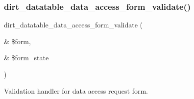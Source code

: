\subsubsection{\texorpdfstring{dirt\+\_\+datatable\+\_\+data\+\_\+access\+\_\+form\+\_\+validate()}{dirt\_datatable\_data\_access\_form\_validate()}}
{\footnotesize\ttfamily dirt\+\_\+datatable\+\_\+data\+\_\+access\+\_\+form\+\_\+validate (\begin{DoxyParamCaption}\item[{\&}]{\$form,  }\item[{\&}]{\$form\+\_\+state }\end{DoxyParamCaption})}

Validation handler for data access request form. 